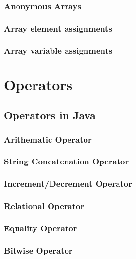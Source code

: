 \documentclass[14pt,fleqn]{extbook} %
\begin{document}
\subsection{Anonymous Arrays}

\subsection{Array element assignments}

\subsection{Array variable assignments}



\chapter{Operators}
\section{Operators in Java}

\subsection{Arithematic Operator}

\subsection{String Concatenation Operator}

\subsection{Increment/Decrement Operator}

\subsection{Relational Operator}

\subsection{Equality Operator}

\subsection{Bitwise Operator}

\end{document}
